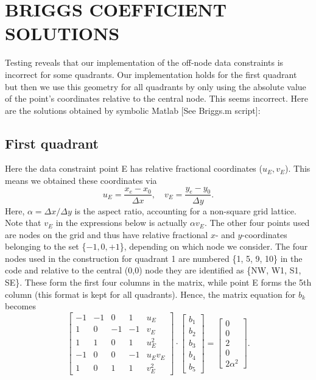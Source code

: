 \documentclass[12pt,letterpaper,margin=0.5in]{article}
\begin{document}
\section{BRIGGS COEFFICIENT SOLUTIONS}

Testing reveals that our implementation of the off-node data constraints is incorrect
for some quadrants.  Our implementation holds for the first quadrant but then we
use this geometry for all quadrants by only using the absolute value of the point's
coordinates relative to the central node.  This seems incorrect.  Here are the
solutions obtained by symbolic Matlab [See Briggs.m script]:
\subsection{First quadrant}
Here the data constraint point E has relative fractional coordinates ($u_E, v_E$).  This means
we obtained these coordinates via
\begin{equation}
	u_E = \frac{x_e - x_0}{\Delta x}, \quad v_E = \frac{y_e - y_0}{\Delta y}.
\end{equation}
Here, $\alpha = \Delta x/\Delta y$ is the aspect ratio, accounting for a non-square grid lattice.
Note that $v_E$ in the expressions below is actually $\alpha v_E$.
The other four points used are
nodes on the grid and thus have relative fractional $x$- and $y$-coordinates belonging to the set \{$-1, 0, +1$\},
depending on which node we consider. The four nodes used in the
construction for quadrant 1 are numbered \{1, 5, 9, 10\} in the code and relative to the central (0,0) node they
are identified as \{NW, W1, S1, SE\}. These form the first four columns in the matrix, while point E
forms the 5th column (this format is kept for all quadrants).  Hence, the matrix equation
for $b_k$ becomes
\begin{equation}
\left[ {\begin{array}{*{20}{r}}
{ - 1}&{ - 1}&0&1&{{u_E}}\\
1&0&{ - 1}&{ - 1}&{{v_E}}\\
1&1&0&1&{u_E^2}\\
{ - 1}&0&0&{ - 1}&{{u_E}{v_E}}\\
1&0&1&1&{v_E^2}
\end{array}} \right] \cdot \left[ {\begin{array}{*{20}{c}}
{{b_1}}\\
{{b_2}}\\
{{b_3}}\\
{{b_4}}\\
{{b_5}}
\end{array}} \right] = \left[ {\begin{array}{*{20}{c}}
0\\
0\\
2\\
0\\
2\alpha^2
\end{array}} \right].
\end{equation}
\end{document}
